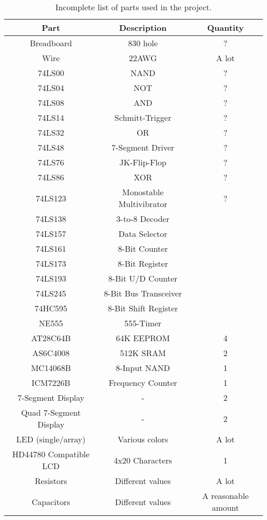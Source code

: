 \begin{table}[H]
  \centering
  \begin{tabular}{c|c|c}
    Part & Description & Quantity \\ \hline
    Breadboard & 830 hole & ? \\
    Wire & 22AWG & A lot \\
    74LS00 \cite{ls00} & NAND & ? \\
    74LS04 \cite{ls04} & NOT & ? \\
    74LS08 \cite{ls08} & AND & ? \\
    74LS14 \cite{ls14} & Schmitt-Trigger & ? \\
    74LS32 \cite{ls32} & OR & ? \\
    74LS48 \cite{ls48} & 7-Segment Driver & ? \\
    74LS76 \cite{ls76} & JK-Flip-Flop & ? \\
    74LS86 \cite{ls86} & XOR & ? \\
    74LS123 \cite{ls123} & Monostable Multivibrator & ? \\
    74LS138 \cite{ls138} & 3-to-8 Decoder & \\
    74LS157 \cite{ls157} & Data Selector & \\
    74LS161 \cite{ls161} & 8-Bit Counter & \\
    74LS173 \cite{ls173} & 8-Bit Register & \\
    74LS193 \cite{ls193} & 8-Bit U/D Counter & \\
    74LS245 \cite{ls245} & 8-Bit Bus Transceiver & \\
    74HC595 \cite{hc595} & 8-Bit Shift Register & \\
    NE555 \cite{555} & 555-Timer & \\
    AT28C64B \cite{28c64} & 64K EEPROM & 4 \\
    AS6C4008 \cite{c64008} & 512K SRAM & 2 \\
    MC14068B \cite{14068B} & 8-Input NAND & 1 \\
    ICM7226B \cite{7226B} & Frequency Counter & 1 \\
    7-Segment Display & - & 2 \\
    Quad 7-Segment Display & - & 2 \\
    LED (single/array) & Various colors & A lot \\
    HD44780 Compatible LCD & 4x20 Characters & 1 \\
    Resistors & Different values & A lot \\
    Capacitors & Different values & A reasonable amount \\    
  \end{tabular}
  \caption{Incomplete list of parts used in the project.}
  \label{tab:parts}
\end{table}

